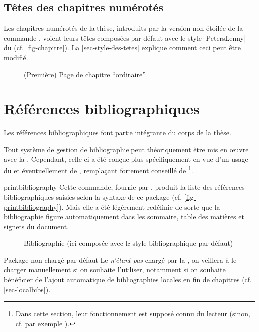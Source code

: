 \subsection{Têtes des chapitres numérotés}
\label{sec-chapitres-numerotes}%
%

Les chapitres numérotés de la thèse, introduits par la version non étoilée de la
commande , voient leurs têtes composées par défaut avec
le style |PetersLenny| du  (cf. \vref{fig-chapitre}). La
\vref{sec-style-des-tetes} explique comment ceci peut être modifié.

\begin{figure}[ht]
  \centering
  \caption[Chapitre \enquote{ordinaire}]{(Première) Page de chapitre
    \enquote{ordinaire}}
  \label{fig-chapitre}
\end{figure}

\section{Références bibliographiques}\label{sec-refer-bibl}
%

Les références bibliographiques font partie intégrante du corps de la thèse.

Tout système de gestion de bibliographie peut théoriquement être mis en œuvre
avec la \yatCl. Cependant, celle-ci a été conçue plus spécifiquement en vue
d'un usage du  et éventuellement de ,
remplaçant fortement conseillé de \footnote{Dans cette section,
  leur fonctionnement est supposé connu du lecteur (sinon, cf. par exemple
  \cite{en-ligne6}).}.

\begin{docCommand}[doc description=\mandatory]{printbibliography}{}
  Cette commande, fournie par , produit la liste des
  références bibliographiques saisies selon la syntaxe de ce package (cf.
  \vref{fig-printbibliography}). Mais elle a été légèrement redéfinie de sorte
  que la bibliographie figure automatiquement dans les sommaire, table des
  matières et signets du document.
\end{docCommand}

\begin{figure}[htbp]
  \centering
  \caption[Bibliographie]{Bibliographie (ici composée avec le style
    bibliographique par défaut)}
  \label{fig-printbibliography}
\end{figure}

\begin{dbwarning}{Package  non chargé par défaut}{}
  Le  \emph{n'étant pas} chargé par la \yatCl, on veillera
  à le charger manuellement si on souhaite l'utiliser, notamment si on souhaite
  bénéficier de l'ajout automatique de bibliographies locales en fin de
  chapitres (cf. \vref{sec-localbibs}).
\end{dbwarning}

